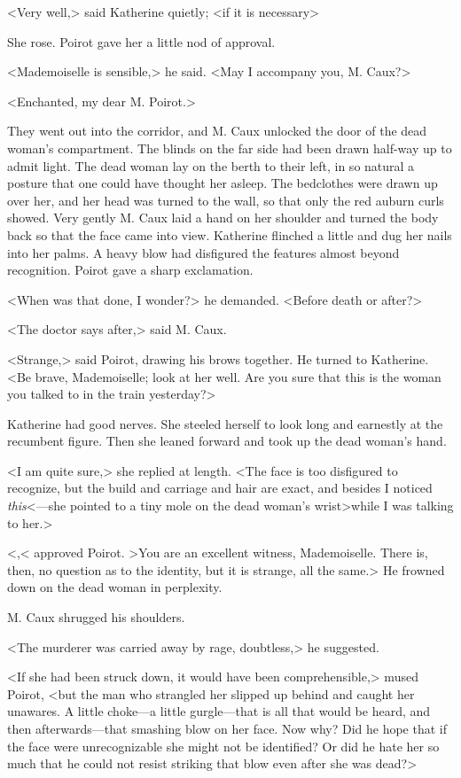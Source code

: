 <Very well,> said Katherine quietly; <if it is necessary\longdash>

She rose. Poirot gave her a little nod of approval.

<Mademoiselle is sensible,> he said. <May I accompany you, M. Caux?>

<Enchanted, my dear M. Poirot.>

They went out into the corridor, and M. Caux unlocked the door of the dead woman's compartment. The blinds on the far side had been drawn half-way up to admit light. The dead woman lay on the berth to their left, in so natural a posture that one could have thought her asleep. The bedclothes were drawn up over her, and her head was turned to the wall, so that only the red auburn curls showed. Very gently M. Caux laid a hand on her shoulder and turned the body back so that the face came into view. Katherine flinched a little and dug her nails into her palms. A heavy blow had disfigured the features almost beyond recognition. Poirot gave a sharp exclamation.

<When was that done, I wonder?> he demanded. <Before death or after?>

<The doctor says after,> said M. Caux.

<Strange,> said Poirot, drawing his brows together. He turned to Katherine. <Be brave, Mademoiselle; look at her well. Are you sure that this is the woman you talked to in the train yesterday?>

Katherine had good nerves. She steeled herself to look long and earnestly at the recumbent figure. Then she leaned forward and took up the dead woman's hand.

<I am quite sure,> she replied at length. <The face is too disfigured to recognize, but the build and carriage and hair are exact, and besides I noticed \emph{this}<—she pointed to a tiny mole on the dead woman's wrist\longdash>while I was talking to her.>

<,< approved Poirot. >You are an excellent witness, Mademoiselle. There is, then, no question as to the identity, but it is strange, all the same.> He frowned down on the dead woman in perplexity.

M. Caux shrugged his shoulders.

<The murderer was carried away by rage, doubtless,> he suggested.

<If she had been struck down, it would have been comprehensible,> mused Poirot, <but the man who strangled her slipped up behind and caught her unawares. A little choke—a little gurgle—that is all that would be heard, and then afterwards—that smashing blow on her face. Now why? Did he hope that if the face were unrecognizable she might not be identified? Or did he hate her so much that he could not resist striking that blow even after she was dead?>

